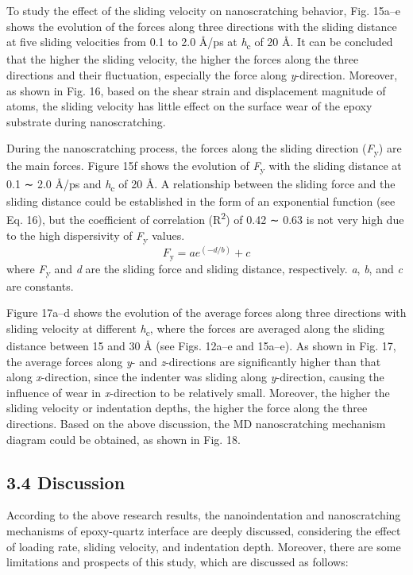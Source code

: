\documentclass{article}
\begin{document}
To study the effect of the sliding velocity on nanoscratching behavior, Fig. 15a–e shows the evolution of the forces along three directions with the sliding distance at five sliding velocities from 0.1 to 2.0 Å/ps at \emph{h}\textsubscript{c} of 20 Å. It can be concluded that the higher the sliding velocity, the higher the forces along the three directions and their fluctuation, especially the force along \emph{y}-direction. Moreover, as shown in Fig. 16, based on the shear strain and displacement magnitude of atoms, the sliding velocity has little effect on the surface wear of the epoxy substrate during nanoscratching.

During the nanoscratching process, the forces along the sliding direction (\emph{F}\textsubscript{y}) are the main forces. Figure 15f shows the evolution of \emph{F}\textsubscript{y} with the sliding distance at 0.1 ∼ 2.0 Å/ps and \emph{h}\textsubscript{c} of 20 Å. A relationship between the sliding force and the sliding distance could be established in the form of an exponential function (see Eq. 16), but the coefficient of correlation (R\textsuperscript{2}) of 0.42 ∼ 0.63 is not very high due to the high dispersivity of \emph{F}\textsubscript{y} values.
\begin{equation}
F_{\mathrm{y}}=ae^{(-d/b)}+c\tag{16}
\end{equation}
where \emph{F}\textsubscript{y} and \emph{d} are the sliding force and sliding distance, respectively. \emph{a}, \emph{b}, and \emph{c} are constants.

Figure 17a–d shows the evolution of the average forces along three directions with sliding velocity at different \emph{h}\textsubscript{c}, where the forces are averaged along the sliding distance between 15 and 30 Å (see Figs. 12a–e and 15a–e). As shown in Fig. 17, the average forces along \emph{y}- and \emph{z}-directions are significantly higher than that along \emph{x}-direction, since the indenter was sliding along \emph{y}-direction, causing the influence of wear in \emph{x}-direction to be relatively small. Moreover, the higher the sliding velocity or indentation depths, the higher the force along the three directions. Based on the above discussion, the MD nanoscratching mechanism diagram could be obtained, as shown in Fig. 18.

\subsection*{3.4 Discussion}

According to the above research results, the nanoindentation and nanoscratching mechanisms of epoxy-quartz interface are deeply discussed, considering the effect of loading rate, sliding velocity, and indentation depth. Moreover, there are some limitations and prospects of this study, which are discussed as follows:
\end{document}
